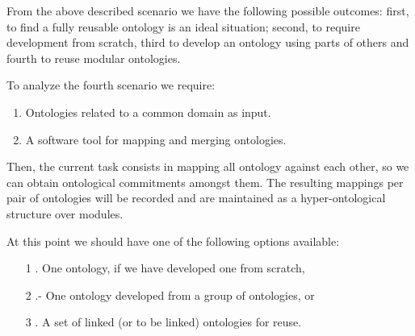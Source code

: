 From the above described scenario we have the following possible outcomes: first, to find a fully reusable ontology is an ideal situation; second, to require development from scratch, third to develop an ontology using parts of others and fourth to reuse modular ontologies. 

To analyze the fourth scenario we require:

\begin{enumerate}
	\item Ontologies related to a common domain as input.
	\item A software tool for mapping and merging ontologies.
\end{enumerate}


Then, the current task consists in mapping all ontology against each other, so we can obtain ontological commitments amongst them.  The resulting mappings per pair of ontologies will be recorded and are maintained as a hyper-ontological structure over modules. 

At this point we should have one of the following options available: 

\begin{itemize}
	
	\item[1]. One ontology, if we have developed one from scratch, 
	\item[2].- One ontology developed from a group of ontologies, or 
	\item[3]. A set of linked (or to be linked) ontologies for reuse.  
	
\end{itemize}

